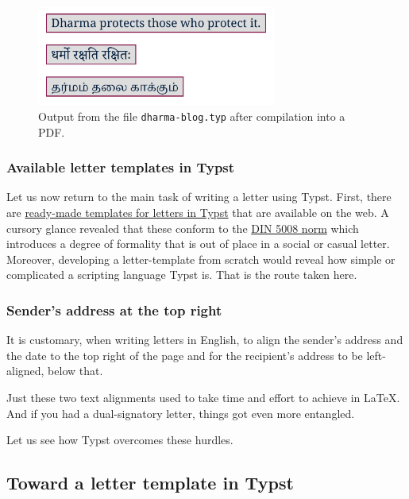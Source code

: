 \documentclass[
  a4paper,
]{article}
\begin{document}
\begin{figure}
\hypertarget{fig:dharma}{%
\centering
\includegraphics[width=0.7\textwidth,height=\textheight]{images/dharma.png}
\caption{Output from the file \texttt{dharma-blog.typ} after compilation
into a PDF.}\label{fig:dharma}
}
\end{figure}

\hypertarget{available-letter-templates-in-typst}{%
\subsubsection{Available letter templates in
Typst}\label{available-letter-templates-in-typst}}

Let us now return to the main task of writing a letter using Typst.
First, there are
\href{https://github.com/qjcg/awesome-typst\#letters}{ready-made
templates for letters in Typst} that are available on the web. A cursory
glance revealed that these conform to the
\href{https://en.wikipedia.org/wiki/DIN_5008}{DIN 5008 norm} which
introduces a degree of formality that is out of place in a social or
casual letter. Moreover, developing a letter-template from scratch would
reveal how simple or complicated a scripting language Typst is. That is
the route taken here.

\hypertarget{senders-address-at-the-top-right}{%
\subsubsection{Sender's address at the top
right}\label{senders-address-at-the-top-right}}

It is customary, when writing letters in English, to align the sender's
address and the date to the top right of the page and for the
recipient's address to be left-aligned, below that.

Just these two text alignments used to take time and effort to achieve
in LaTeX. And if you had a dual-signatory letter, things got even more
entangled.

Let us see how Typst overcomes these hurdles.

\hypertarget{toward-a-letter-template-in-typst}{%
\subsection{Toward a letter template in
Typst}\label{toward-a-letter-template-in-typst}}
\end{document}
